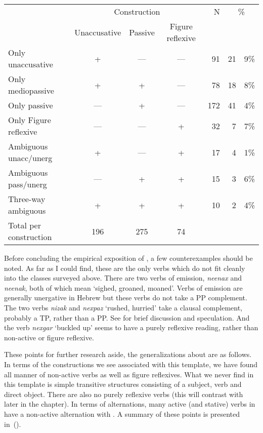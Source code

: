 \ex
\begin{tabular}{l|ccc|r|r@{.}l}
				& \multicolumn{3}{c|}{Construction}	& N	& \multicolumn{2}{c}{\%} \\
				 	& Unaccusative	& Passive & Figure reflexive & & \multicolumn{2}{c}{} \\\hline\hline
Only unaccusative			&	+			& ---			&	---		&	91	&	21&9\% \\
Only mediopassive			&	+			& +				& ---		&	78	&	18&8\% \\
Only passive					&	---			& +				&	---		&	172	& 41&4\% \\\hline
Only Figure reflexive		& ---			& ---			& +			& 32	& 7&7\% \\\hline
Ambiguous unacc/unerg	& +				& ---			& +			& 17	& 4&1\% \\
Ambiguous pass/unerg	& ---			& +				& +			& 15	& 3&6\% \\
Three-way ambiguous		& +				& +				& +			& 10	& 2&4\% \\\hline\hline
Total per construction		& 196		&	275				& 74 & \multicolumn{3}{l}{} \\

\end{tabular}
\xe

Before concluding the empirical exposition of {\tnif}, a few counterexamples should be noted. As far as I could find, these are the only verbs which do not fit cleanly into the classes surveyed above. There are two verbs of emission, \emph{neenax} and \emph{neenak}, both of which mean `sighed, groaned, moaned'. Verbs of emission are generally unergative in Hebrew \citep{siloni12,gafter14li} but these verbs do not take a PP complement. The two verbs \emph{nizak} and \emph{nexpaz} `rushed, hurried' take a clausal complement, probably a TP, rather than a PP. See \citet[126]{kastner16phd} for brief discussion and speculation. And the verb \emph{nexgar} `buckled up' seems to have a purely reflexive reading, rather than non-active or figure reflexive.

These points for further research aside, the generalizations about {\tnif} are as follows. In terms of the constructions we see associated with this template, we have found all manner of non-active verbs as well as figure reflexives. What we never find in this template is simple transitive structures consisting of a subject, verb and direct object. There are also no purely reflexive verbs (this will contrast with {\thit} later in the chapter). In terms of alternations, many active (and stative) verbs in {\tkal} have a non-active alternation with {\tnif}. A summary of these points is presented in~(\nextx).

